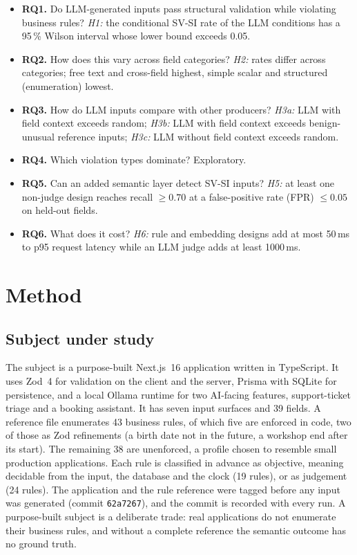 \documentclass[conference]{IEEEtran}
\begin{document}
\begin{itemize}
  \item \textbf{RQ1.} Do LLM-generated inputs pass structural validation while violating business
  rules? \emph{H1:} the conditional SV-SI rate of the LLM conditions has a 95\,\% Wilson interval whose
  lower bound exceeds 0.05.
  \item \textbf{RQ2.} How does this vary across field categories? \emph{H2:} rates differ across
  categories; free text and cross-field highest, simple scalar and structured (enumeration) lowest.
  \item \textbf{RQ3.} How do LLM inputs compare with other producers? \emph{H3a:} LLM with field
  context exceeds random; \emph{H3b:} LLM with field context exceeds benign-unusual reference inputs;
  \emph{H3c:} LLM without field context exceeds random.
  \item \textbf{RQ4.} Which violation types dominate? Exploratory.
  \item \textbf{RQ5.} Can an added semantic layer detect SV-SI inputs? \emph{H5:} at least one
  non-judge design reaches recall $\geq 0.70$ at a false-positive rate (FPR) $\leq 0.05$ on held-out
  fields.
  \item \textbf{RQ6.} What does it cost? \emph{H6:} rule and embedding designs add at most 50\,ms to
  p95 request latency while an LLM judge adds at least 1000\,ms.
\end{itemize}

\section{Method}
\label{sec:method}

\subsection{Subject under study}
The subject is a purpose-built Next.js~16 application written in TypeScript. It uses Zod~4 for
validation on the client and the server, Prisma with SQLite for persistence, and a local Ollama runtime
for two AI-facing features, support-ticket triage and a booking assistant. It has seven input surfaces
and 39 fields. A reference file enumerates 43 business rules, of which five are enforced in code, two of
those as Zod refinements (a birth date not in the future, a workshop end after its start). The remaining
38 are unenforced, a profile chosen to resemble small production applications. Each rule is classified in
advance as objective, meaning decidable from the input, the database and the clock (19 rules), or as
judgement (24 rules). The application and the rule reference were tagged before any input was generated
(commit \texttt{62a7267}), and the commit is recorded with every run. A purpose-built subject is a
deliberate trade: real applications do not enumerate their business rules, and without a complete
reference the semantic outcome has no ground truth.
\end{document}
